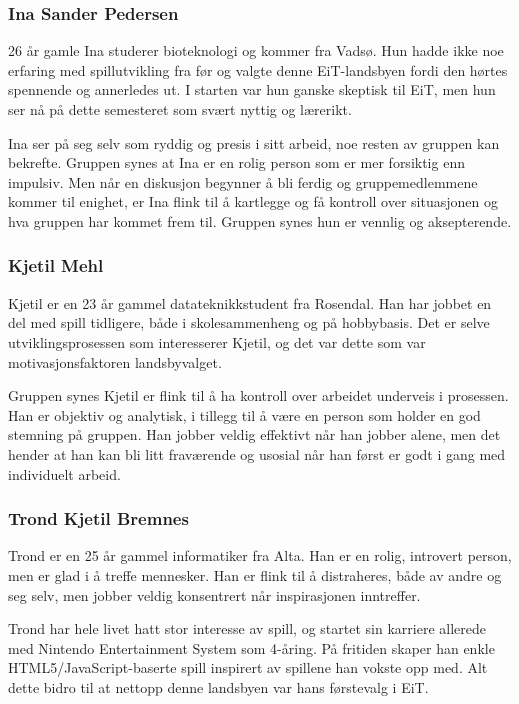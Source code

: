 	\subsubsection{Ina Sander Pedersen}
	26 år gamle Ina studerer bioteknologi og kommer fra Vadsø. Hun hadde ikke noe erfaring med spillutvikling fra før og valgte denne EiT-landsbyen fordi den hørtes spennende og annerledes ut. I starten var hun ganske skeptisk til EiT, men hun ser nå på dette semesteret som svært nyttig og lærerikt.

	Ina ser på seg selv som ryddig og presis i sitt arbeid, noe resten av gruppen kan bekrefte. Gruppen synes at Ina er en rolig person som er mer forsiktig enn impulsiv. Men når en diskusjon begynner å bli ferdig og gruppemedlemmene kommer til enighet, er Ina flink til å kartlegge og få kontroll over situasjonen og hva gruppen har kommet frem til. Gruppen synes hun er vennlig og aksepterende.

	\subsubsection{Kjetil Mehl}
	Kjetil er en 23 år gammel datateknikkstudent fra Rosendal. Han har jobbet en del
med spill tidligere, både i skolesammenheng og på hobbybasis. Det er
selve utviklingsprosessen som interesserer Kjetil, og det var dette som
var motivasjonsfaktoren landsbyvalget.

	Gruppen synes Kjetil er flink til å ha kontroll over arbeidet underveis i prosessen. Han er objektiv og analytisk, i tillegg til å være en person som holder en god stemning på gruppen. Han jobber veldig effektivt når han jobber alene, men det hender at han kan bli litt fraværende og usosial når han først er godt i gang med individuelt arbeid.


	\subsubsection{Trond Kjetil Bremnes}
	Trond er en 25 år gammel informatiker fra Alta. Han er en rolig, introvert person, men er glad i å treffe mennesker. Han er flink til å distraheres, både av andre og seg selv, men jobber veldig konsentrert når inspirasjonen inntreffer.

	Trond har hele livet hatt stor interesse av spill, og startet sin karriere allerede med Nintendo Entertainment System som 4-åring. På fritiden skaper han enkle HTML5/JavaScript-baserte spill inspirert av spillene han vokste opp med. Alt dette bidro til at nettopp denne landsbyen var hans førstevalg i EiT.

